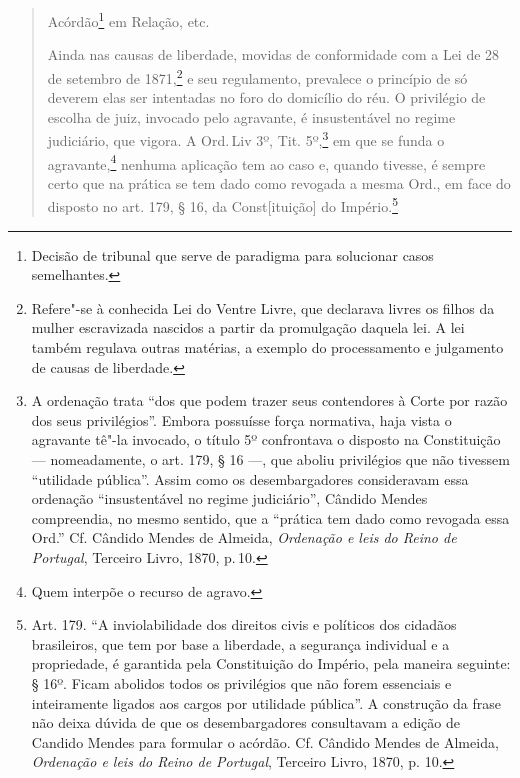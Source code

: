\begin{quote}
Acórdão\footnote{Decisão de tribunal que serve de paradigma para
  solucionar casos semelhantes.} em Relação, etc.


Ainda nas causas de liberdade, movidas de conformidade com a Lei de 28
de setembro de 1871,\footnote{Refere"-se à conhecida Lei do Ventre
  Livre, que declarava livres os filhos da mulher escravizada nascidos a
  partir da promulgação daquela lei. A lei também regulava outras
  matérias, a exemplo do processamento e julgamento de causas de
  liberdade.} e seu regulamento, prevalece o princípio de só deverem
elas ser intentadas no foro do domicílio do réu. O privilégio de escolha
de juiz, invocado pelo agravante, é insustentável no regime judiciário,
que vigora. A Ord.\,Liv 3º, Tit. 5º,\footnote{A ordenação trata ``dos
  que podem trazer seus contendores à Corte por razão dos seus
  privilégios''. Embora possuísse força normativa, haja vista o agravante
  tê"-la invocado, o título 5º confrontava o disposto na Constituição ---
  nomeadamente, o art. 179, § 16 ---, que aboliu privilégios que não
  tivessem ``utilidade pública''. Assim como os desembargadores
  consideravam essa ordenação ``insustentável no regime judiciário'',
  Cândido Mendes compreendia, no mesmo sentido, que a ``prática tem dado
  como revogada essa Ord.'' Cf. Cândido Mendes de Almeida,
\emph{Ordenação e leis do Reino de Portugal}, Terceiro Livro, 1870, p.\,10.} em
que se funda o agravante,\footnote{Quem interpõe o recurso de agravo.}
nenhuma aplicação tem ao caso e, quando tivesse, é sempre certo que na
prática se tem dado como revogada a mesma Ord., em face do disposto no
art. 179, § 16, da Const{[}ituição{]} do Império.\footnote{Art. 179. ``A
  inviolabilidade dos direitos civis e políticos dos cidadãos
  brasileiros, que tem por base a liberdade, a segurança individual e a
  propriedade, é garantida pela Constituição do Império, pela maneira
  seguinte: § 16º. Ficam abolidos todos os privilégios que não forem
  essenciais e inteiramente ligados aos cargos por utilidade pública''. A
  construção da frase não deixa dúvida de que os desembargadores
  consultavam a edição de Candido Mendes para formular o acórdão. Cf. Cândido Mendes de Almeida,
  \emph{Ordenação e leis do Reino de Portugal}, Terceiro Livro, 1870, p. 10.}


\end{quote}
